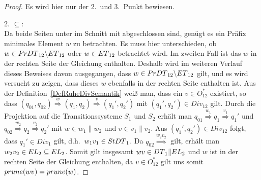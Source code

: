 \begin{proof} Es wird hier nur der 2.\ und 3.\ Punkt bewiesen.

  2. \glqq{}$\subseteq$\grqq{}:\\
  Da beide Seiten unter \cont{} im Schnitt mit \EL{} abgeschlossen sind, genügt
  es ein Präfix minimales Element $w$ zu betrachten. Es muss hier unterschieden, ob $w\in
  PrDT{}_{12}\backslash ET{}_{12}$ oder $w\in ET{}_{12}$ betrachtet wird. Im
  zweiten Fall ist das $w$ in der rechten Seite der Gleichung enthalten.
  Deshalb wird im weiteren Verlauf dieses Beweises davon ausgegangen, dass
  $w\in PrDT{}_{12}\backslash ET{}_{12}$ gilt, und es wird versucht zu
  zeigen, dass dieses $w$ ebenfalls in der rechten Seite enthalten ist. Aus der
  Definition~\ref{DefRuheDivSemantik} weiß man, dass ein $v\in O^*_{12}$
  existiert, so dass $(q_{01},q_{02}) \overset{w}{\Rightarrow} (q_1,q_2)
  \overset{v}{\Rightarrow} (q_1',q_2')$ mit $(q_1',q_2')\in Div_{12}$ gilt.
  Durch die Projektion auf die Transitionssysteme $S_1$ und $S_2$ erhält man
  $q_{01} \overset{w_1}{\Rightarrow} q_1 \overset{v_1}{\Rightarrow} q_1'$ und
  $q_{02} \overset{w_2}{\Rightarrow} q_2 \overset{v_2}{\Rightarrow} q_2'$ mit
  $w\in w_1\|w_2$ und $v\in v_1\|v_2$. Aus $(q_1',q_2')\in Div_{12}$ folgt,
  dass \oBdA{} $q_1'\in Div_1$ gilt, d.h.\ $w_1v_1\in StDT{}_1$. Da $q_{02}
  \overset{w_2v_2}{\Rightarrow}$ gilt, erhält man $w_2v_2\in EL_2\subseteq
  EL{}_2$. Somit gilt insgesamt $wv\in DT{}_1\|EL{}_2$ und $w$ ist in der
  rechten Seite der Gleichung enthalten, da $v\in O_{12}^*$ gilt uns somit
  $prune{}(wv)=prune{}(w)$.


\end{proof}
